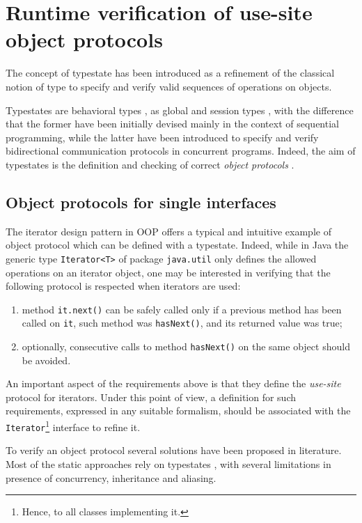 \section{Runtime verification of use-site object protocols}\label{use-site}

The concept of typestate \cite{StromYemini86,GarciaTWA14} has been introduced as a refinement of the classical notion of type to specify and verify valid sequences of operations on objects.

Typestates are behavioral types \cite{AnconaBB0CDGGGH16}, as global \cite{CarboneHY07} and session types \cite{Honda93}, with the difference that the former have been initially devised mainly in the context of sequential programming, while the latter have been introduced to specify and verify bidirectional communication protocols in concurrent programs. Indeed, the aim of typestates is the definition and checking of correct \emph{object protocols} \cite{BacchianiBGMR22}.

\subsection{Object protocols for single interfaces}\label{iterator}
The iterator design pattern in OOP offers a typical and intuitive example of object protocol which can be defined with a typestate. Indeed, while in Java the generic type \lstinline|Iterator<T>| of package \lstinline|java.util| only defines the allowed operations on an iterator object, one may be interested in verifying that the following protocol is respected when iterators are used:
\begin{enumerate}
 \item method \lstinline|it.next()| can be safely called only if a previous method has been called on \lstinline|it|, such method was \lstinline|hasNext()|, and its returned value was true;
 \item optionally, consecutive calls to method \lstinline|hasNext()| on the same object should be avoided.
\end{enumerate}

An important aspect of the requirements above is that they define the \emph{use-site} protocol for iterators. Under this point of view, a definition  for such requirements, expressed in any suitable formalism, should be associated with the \lstinline|Iterator|\footnote{Hence, to all classes implementing it.} interface to refine it.

To verify an object protocol several solutions have been proposed in literature.
Most of the static approaches rely on typestates \cite{KouzapasDPG18,VoineaDG20,MotaGR21,BacchianiBGMR22}, with several limitations in presence of concurrency, inheritance and aliasing.

